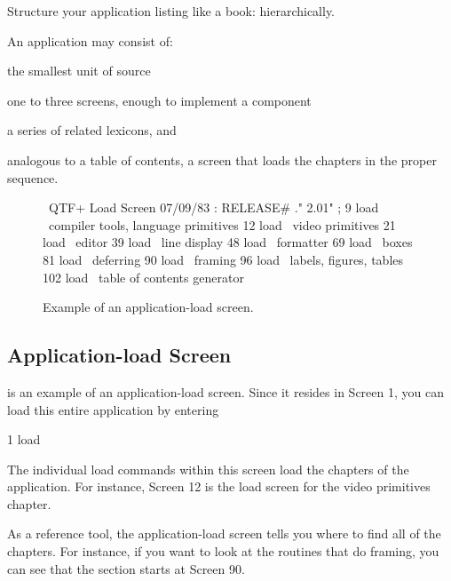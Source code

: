 \begin{tip}
Structure your application listing like a book: hierarchically.
\end{tip}
An application may consist of:

\begin{description}\parsep=0pt\itemsep=0pt
\item[Screens:] the smallest unit of \Forth{} source
\item[Lexicons:] one to three screens, enough to
implement a component
\item[Chapters:] a series of related lexicons, and
\item[Load screens:] analogous to a table of contents, a screen that
loads the chapters in the proper sequence.
\end{description}


\begin{figure*}[tttt]
\caption{Example of an application-load screen.}
\setcounter{screen}{1}
\begin{Screen}
\ QTF+ Load Screen                                      07/09/83
: RELEASE#   ." 2.01" ;
  9 load  \ compiler tools, language primitives
 12 load  \ video primitives
 21 load  \ editor
 39 load  \ line display
 48 load  \ formatter
 69 load  \ boxes
 81 load  \ deferring
 90 load  \ framing
 96 load  \ labels, figures, tables
102 load  \ table of contents generator




\end{Screen}
\end{figure*}%

\subsection{Application-load Screen}%

 is an example of an application-load screen.  Since it
resides in Screen 1, you can load this entire application by entering
\begin{Code}
1 load
\end{Code}
The individual load commands within this screen load the chapters of
the application.  For instance, Screen 12 is the load screen for the
video primitives chapter.

As a reference tool, the application-load screen tells you where to
find all of the chapters.  For instance, if you want to look at the
routines that do framing, you can see that the section starts at
Screen 90.


